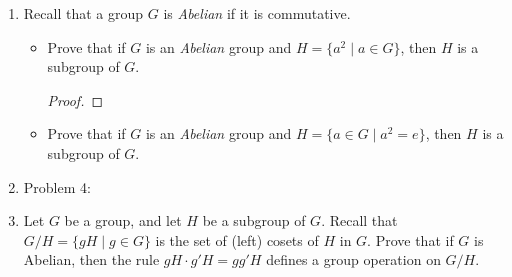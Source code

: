 \documentclass[12pt,a4paper,reqno,parskip=full]{amsart}
\numberwithin{equation}{section}
\theoremstyle{plain}
\theoremstyle{definition}
\begin{document}
\begin{enumerate}
        \begin{proof}
          If we pair every element in $G$ with its inverse, and there exists at most
          one element $g$ that satisfies the conditions of the problem, then there
          will be $|G|/2 - 1$ pairs of two distinct elements. $e$ is paired with
          itself, so there must be one element left over and for $G$ to be a well defined group
          this element $g$ must be its own inverse. If there are more than one elements
          that are their own inverse then $G$ still satisfies the problem.
        \end{proof}

  \item Recall that a group $G$ is \emph{Abelian} if it is commutative.
        \begin{itemize}
          \item Prove that if $G$ is an \emph{Abelian} group and
                $H=\{a^2\mid a\in G\}$, then $H$ is a subgroup of $G$.

                \begin{proof}
                  
                \end{proof}
          \item Prove that if $G$ is an \emph{Abelian} group and
                $H=\{a\in G\mid a^2=e\}$, then $H$ is a subgroup of $G$.
        \end{itemize}

  \item Problem 4:

  \item Let $G$ be a group, and let $H$ be a subgroup of $G$. Recall that
        $G/H=\{gH\mid g\in G\}$ is the set of (left) cosets of $H$ in $G$.
        Prove that if $G$ is Abelian, then the rule $gH\cdot g'H=gg'H$
        defines a group operation on $G/H$.
\end{enumerate}
\end{document}
